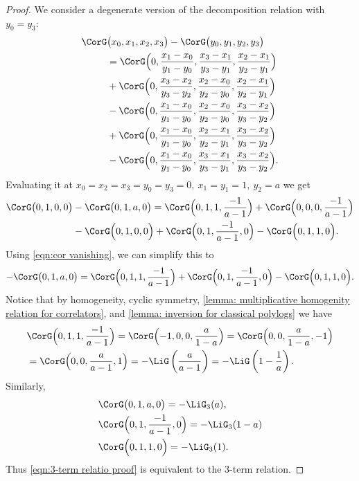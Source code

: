 \documentclass[a4paper]{amsart}
\begin{document}
\begin{proof} We consider a degenerate version of the decomposition relation with $y_0=y_3$:
\begin{align*}
\CorG&\bigl(x_0,x_1 ,x_2 , x_3\bigr)-\CorG\bigl(y_0, y_1, y_2, y_3\bigr)\\
&=\CorG\Bigl(0,\frac{x_1-x_0}{y_1-y_0} , \frac{x_3-x_1}{y_3-y_1} , \frac{x_2-x_1}{y_2-y_1}\Bigr)\\
&+\CorG\Bigl(0,\frac{x_3-x_2}{y_3-y_2},\frac{x_2-x_0}{y_2-y_0}, \frac{x_2-x_1}{y_2-y_1}\Bigr)\\
&-\CorG\Bigl(0,\frac{x_1-x_0}{y_1-y_0} ,\frac{x_2-x_0}{y_2-y_0} , \frac{x_3-x_2}{y_3-y_2}\Bigr)\\
&+\CorG\Bigl(0,\frac{x_1-x_0}{y_1-y_0} , \frac{x_2-x_1}{y_2-y_1} , \frac{x_3-x_2}{y_3-y_2}\Bigr)\\
&-\CorG\Bigl(0,\frac{x_1-x_0}{y_1-y_0} , \frac{x_3-x_1}{y_3-y_1} , \frac{x_3-x_2}{y_3-y_2}\Bigr).
\end{align*}
Evaluating it at $x_0=x_2=x_3=y_0=y_3=0,\: x_1=y_1=1,\: y_2=a$ we get
\begin{align*}
\CorG\bigl(0,1 ,0 ,0 \bigr)&-\CorG\bigl(0, 1,a, 0\bigr)=\CorG\Bigl(0,1, 1, \frac{-1}{a-1}\Bigr)+\CorG\Bigl(0,0,0, \frac{-1}{a-1}\Bigr)\\
&-\CorG\Bigl(0,1 ,0 , 0\Bigr)+\CorG\Bigl(0,1 , \frac{-1}{a-1} ,0\Bigr)-\CorG\Bigl(0,1 , 1 , 0\Bigr).
\end{align*}
Using \eqref{eqn:cor vanishing}, we can simplify this to 
\begin{equation}\label{eqn:3-term relatio proof}
-\CorG\bigl(0, 1,a, 0\bigr)=\CorG\Bigl(0,1, 1, \frac{-1}{a-1}\Bigr)+\CorG\Bigl(0,1 , \frac{-1}{a-1} ,0\Bigr)-\CorG\Bigl(0,1 , 1 , 0\Bigr).
\end{equation}
Notice that by homogeneity, cyclic symmetry, \cref{lemma: multiplicative homogenity relation for correlators}, and \cref{lemma: inversion for classical polylogs} we have
\begin{align*}
&\CorG\Bigl(0,1, 1, \frac{-1}{a-1}\Bigr)=\CorG\Bigl(-1,0,0, \frac{a}{1-a}\Bigr)=\CorG\Bigl(0,0, \frac{a}{1-a},-1\Bigr)\\
&=
\CorG\Bigl(0,0, \frac{a}{a-1},1\Bigr)=-\LiG\left(\frac{a}{a-1}\right)=-\LiG\left(1-\frac{1}{a}\right).
\end{align*}
Similarly,
\begin{align*}
    &\CorG\bigl(0, 1,a, 0\bigr)=-\LiG_3(a), \\
    &\CorG\Bigl(0,1 , \frac{-1}{a-1} ,0\Bigr)=-\LiG_3(1-a)\\
    &\CorG\Bigl(0,1 , 1 , 0\Bigr)=-\LiG_3(1).
\end{align*}
Thus \eqref{eqn:3-term relatio proof} is equivalent to the $3$-term relation.
\end{proof}
\end{document}
